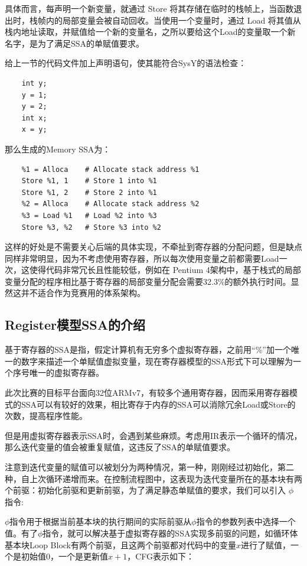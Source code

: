 具体而言，每声明一个新变量，就通过 Store 将其存储在临时的栈帧上，当函数退出时，栈帧内的局部变量会被自动回收。当使用一个变量时，通过 Load 将其值从栈内地址读取，并赋值给一个新的变量名，之所以要给这个Load的变量取一个新名字，是为了满足SSA的单赋值要求。

给上一节的代码文件加上声明语句，使其能符合SysY的语法检查：

\begin{verbatim}
    int y;
    y = 1;
    y = 2;
    int x;
    x = y;
\end{verbatim}

那么生成的Memory SSA为：

\begin{verbatim}
    %1 = Alloca    # Allocate stack address %1
    Store %1, 1    # Store 1 into %1
    Store %1, 2    # Store 2 into %1
    %2 = Alloca    # Allocate stack address %2
    %3 = Load %1   # Load %2 into %3
    Store %3, %2   # Store %3 into %2
\end{verbatim}

这样的好处是不需要关心后端的具体实现，不牵扯到寄存器的分配问题，但是缺点同样非常明显，因为不考虑使用寄存器，所以每次使用变量之前都需要Load一次，这使得代码非常冗长且性能较低，例如在 Pentium 4架构中，基于栈式的局部变量分配的程序相比基于寄存器的局部变量分配会需要32.3\%的额外执行时间\cite{10.1145/1328195.1328197}。显然这并不适合作为竞赛用的体系架构。

\subsection{Register模型SSA的介绍}

基于寄存器的SSA是指，假定计算机有无穷多个虚拟寄存器，之前用“\%”加一个唯一的数字来描述一个单赋值虚拟变量，现在寄存器模型的SSA形式下可以理解为一个序号唯一的虚拟寄存器。

此次比赛的目标平台面向32位ARMv7，有较多个通用寄存器，因而采用寄存器模式的SSA可以有较好的效果，相比寄存于内存的SSA可以消除冗余Load或Store的次数，提高程序性能。

但是用虚拟寄存器表示SSA时，会遇到某些麻烦。考虑用IR表示一个循环的情况，那么迭代变量的值会被重复赋值，这违反了SSA的单赋值要求。

注意到迭代变量的赋值可以被划分为两种情况，第一种，刚刚经过初始化，第二种，自上次循环递增而来。在控制流程图中，这表现为迭代变量所在的基本块有两个前驱：初始化前驱和更新前驱，为了满足静态单赋值的要求，我们可以引入 $\phi$ 指令:

$\phi$指令用于根据当前基本块的执行期间的实际前驱从$\phi$指令的参数列表中选择一个值。有了$\phi$指令，就可以解决基于虚拟寄存器的SSA实现多前驱的问题，如循环体基本块Loop Block有两个前驱，且这两个前驱都对代码中的变量$x$进行了赋值，一个是初始值0，一个是更新值$x+1$，CFG表示如下：

